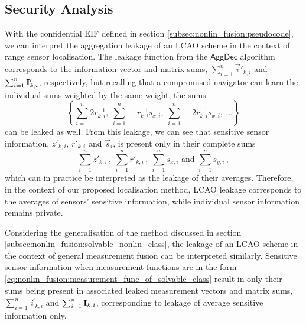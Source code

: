 \subsection{Security Analysis}\label{subsec:nonlin_fusion:security}
With the confidential EIF defined in section \ref{subsec:nonlin_fusion:pseudocode}, we can interpret the aggregation leakage of an LCAO scheme in the context of range sensor localisation. The leakage function from the $\mathsf{AggDec}$ algorithm corresponds to the information vector and matrix sums, $\sum_{i=1}^n\vec{i}'_{k, i}$ and $\sum_{i=1}^n{{\mathbf{I}}}'_{k, i}$, respectively, but recalling that a compromised navigator can learn the individual sums weighted by the same weight, the sums
\begin{equation*}
    \left\{\sum_{i=1}^n2r^{-1}_{k, i},\ \sum_{i=1}^n-r^{-1}_{k, i}s_{x, i},\ \sum_{i=1}^n-2r^{-1}_{k, i}s_{x, i},\ \dots\right\}
\end{equation*}
can be leaked as well. From this leakage, we can see that sensitive sensor information, $z'_{k, i}$, $r'_{k, i}$ and $\vec{s}_i$, is present only in their complete sums
\begin{equation}\label{eq:nonlin_fusion:localisation_leakage}
    \sum_{i=1}^nz'_{k,i}\,,\ \sum_{i=1}^nr'_{k,i}\,,\ \sum_{i=1}^ns_{x,i} \text{ and } \sum_{i=1}^ns_{y,i}\,,
\end{equation}
which can in practice be interpreted as the leakage of their averages. Therefore, in the context of our proposed localisation method, LCAO leakage corresponds to the averages of sensors' sensitive information, while individual sensor information remains private.

Considering the generalisation of the method discussed in section \ref{subsec:nonlin_fusion:solvable_nonlin_class}, the leakage of an LCAO scheme in the context of general measurement fusion can be interpreted similarly. Sensitive sensor information when measurement functions are in the form \eqref{eq:nonlin_fusion:measurement_func_of_solvable_class} result in only their sums being present in associated leaked measurement vectors and matrix sums, $\sum_{i=1}^n\vec{i}_{k, i}$ and $\sum_{i=1}^n{{\mathbf{I}}}_{k, i}$, corresponding to leakage of average sensitive information only.

% 
% 

